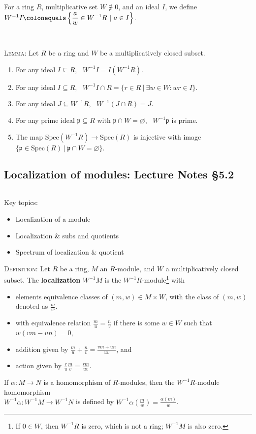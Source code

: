\documentclass[12pt]{amsart}
\newcommand{\p}{\mathfrak{p}}
\newcommand{\Spec}{\mathrm{Spec}}
\newcommand{\0}{$\phantom{.}$}
\newcommand{\1}{\mathbbm{1}}
\newcommand{\ds}{\displaystyle}
\newcommand\ceq{\colonequals}
\begin{document}
\noindent For a ring $R$, multiplicative set $W\not\ni 0$, and an ideal $I$, we define $W^{-1}I \ceq \left\{\ds \frac{a}{w} \in W^{-1}R \ | \ a\in I\right\}$.

\

\noindent \textsc{Lemma:} Let $R$ be a ring and $W$ be a multiplicatively closed subset.
\begin{enumerate}
\item For any ideal $I\subseteq R$, \ $W^{-1}I= I(W^{-1}R)$.
\item For any ideal $I\subseteq R$, \ $W^{-1}I \cap R = \{ r\in R \ | \ \exists w\in W : wr\in I\}$.
\item For any ideal $J\subseteq W^{-1}R$, \ $W^{-1}(J\cap R) = J$.
\item For any prime ideal $\p \subseteq R$ with $\p\cap W=\varnothing$, \ $W^{-1}\p$ is prime.
\item The map $\Spec(W^{-1}R) \to \Spec(R)$ is injective with image $\{ \p \in \Spec(R) \ | \ \p \cap W = \varnothing\}$.
\end{enumerate}

\newpage

\subsection{Localization of modules:  Lecture Notes \S5.2} \0

\begin{framed} Key topics:
\begin{itemize}
\item Localization of a module
\item Localization \& subs and quotients
\item Spectrum of localization \& quotient
\end{itemize}
\end{framed}

\noindent \textsc{Definition:} Let $R$ be a ring, $M$ an $R$-module, and $W$ a multiplicatively closed subset. 
The \mbox{\textbf{localization}} $W^{-1}M$ is the $W^{-1}R$-module\footnote{If $0\in W$, then $W^{-1}R$ is zero, which is not a ring; $W^{-1}M$ is also zero.} with
\begin{itemize}
\item  elements  equivalence classes of $(m,w)\in M\times W$, with the class of $(m,w)$ denoted as $\ds \frac{m}{w}$.
\smallskip
\item with equivalence relation $\ds \frac{m}{u} = \frac{n}{v}$ if there is some $w\in W$ such that $w(vm-un)=0$,
\smallskip
\item addition given by $\ds\frac{m}{u} + \frac{n}{v} = \frac{vm+un}{uv}$, and
\smallskip
\item action given by $\ds\frac{r}{u}  \frac{m}{v} = \frac{rm}{uv}$.
\end{itemize}
If $\alpha:M\to N$ is a homomorphism of $R$-modules, then the $W^{-1}R$-module homomorphism\\ ${W^{-1}\alpha: W^{-1}M\to W^{-1}N}$ is defined by $W^{-1}\alpha (\frac{m}{w}) = \frac{\alpha(m)}{w}$.
\end{document}
